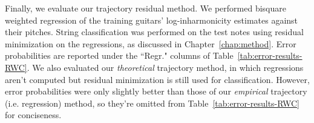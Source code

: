 \documentclass[12pt]{cmuthesis}
\begin{document}

Finally, we evaluate our trajectory residual method. We performed bisquare weighted regression of the training guitars' log-inharmonicity estimates against their pitches. String classification was performed on the test notes using residual minimization on the regressions, as discussed in Chapter~\ref{chap:method}. Error probabilities are reported under the ``Regr." columns of Table~\ref{tab:error-results-RWC}. We also evaluated our \textit{theoretical} trajectory method, in which regressions aren't computed but residual minimization is still used for classification. However, error probabilities were only slightly better than those of our \textit{empirical} trajectory (i.e. regression) method, so they're omitted from Table~\ref{tab:error-results-RWC} for conciseness.

\end{document}
